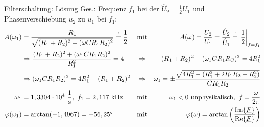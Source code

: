 \begin{frame}[allowframebreaks]
\begin{bsp}{Filterschaltung: Lösung}{}
	Ges.: Frequenz $f_{1}$ bei der $\hat{U}_2 = \frac{1}{2}\hat{U}_1$ und Phasenverschiebung $u_2$ zu $u_1$ bei $f_1$:\b{\hfill}\vspace{-10pt}%
    \begin{align*}%
        A(\omega_1) &= \frac{R_1}{\sqrt{(R_1+R_2)^2+(\omega CR_1R_2)^2}} \overset{!}{=} \frac{1}{2} & 
        &\text{mit}&
        A(\omega) = \frac{U_2}{U_1} = \frac{\hat{U}_2}{\hat{U}_1} \overset{!}{=} \left.\frac{1}{2}\right|_{f=f_1}
        \\[+2pt]
        &\Rightarrow \frac{(R_1+R_2)^2 + (\omega_1 CR_1R_2)^2}{R_1^2} = 4 &
        &\Rightarrow &
        (R_1+R_2)^2 + (\omega_1 C R_1R_{\mathrm{C}})^2 = 4R_1^2
        \\
        &\Rightarrow (\omega_1 CR_1R_2)^2 = 4R_1^2 - (R_1+R_2)^2 &
        &\Rightarrow&
        \omega_1 = \pm \frac{\sqrt{4R_1^2 - (R_1^2 + 2R_1R_2 + R_2^2)}}{CR_1R_2}
        \\[+2pt]
        \omega_1 &= 1,3304\cdot 10^4\ \frac{1}{\mathrm{s}},\ f_1 = 2,117\ \mathrm{kHz} &
        &\text{mit}&
        \omega_1 < 0 \text{ unphysikalisch},\ f=\frac{\omega}{2\pi}
        \\
        \varphi(\omega_1) &= \arctan(-1,4967) = -56,25\degree &
        &\text{mit}&
        \varphi(\omega) = \arctan\left(\frac{\Im\{\underline{F}\}}{\Re\{\underline{F}\}}\right)
    \end{align*}
\end{bsp}%
\end{frame}